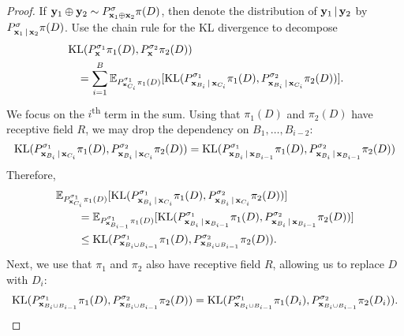 \documentclass[12pt, twoside]{report}
\begin{document}
\begin{proof}
    If $\mathbf{y}_1 \oplus \mathbf{y}_2 \sim P^\sigma_{\mathbf{x}_1 \oplus \mathbf{x}_2} \pi(D)$, then denote the distribution of $\mathbf{y}_1 \,|\, \mathbf{y}_2$ by $P^{\sigma}_{\mathbf{x}_1 \,|\, \mathbf{x}_2} \pi(D)$.
    Use the chain rule for the KL divergence to decompose
    \begin{align}
        &\operatorname{KL}(P^{\sigma_1}_{\mathbf{x}} \pi_1(D), P^{\sigma_2}_{\mathbf{x}} \pi_2(D)) \nonumber \\
        &\quad= \sum_{i=1}^B
        \mathbb{E}_{P_{\mathbf{x}_{C_i}}^{\sigma_1} \pi_1(D)}[
                \operatorname{KL}(
                    P_{\mathbf{x}_{B_i} \,|\, \mathbf{x}_{C_i}}^{\sigma_1} \pi_1(D),
                    P_{\mathbf{x}_{B_i} \,|\, \mathbf{x}_{C_i}}^{\sigma_2} \pi_2(D)
                )
            ].
    \end{align}
    We focus on the $i$\textsuperscript{th} term in the sum.
    Using that $\pi_1(D)$ and $\pi_2(D)$ have receptive field $R$, we may drop the dependency on $B_1, \ldots, B_{i-2}$:
    \begin{align}
        \operatorname{KL}(
            P_{\mathbf{x}_{B_i} \,|\, \mathbf{x}_{C_i}}^{\sigma_1} \pi_1(D),
            P_{\mathbf{x}_{B_i} \,|\, \mathbf{x}_{C_i}}^{\sigma_2} \pi_2(D)
        )
        = \operatorname{KL}(
            P_{\mathbf{x}_{B_i} \,|\, \mathbf{x}_{B_{i-1}}}^{\sigma_1} \pi_1(D),
            P_{\mathbf{x}_{B_i} \,|\, \mathbf{x}_{B_{i-1}}}^{\sigma_2} \pi_2(D)
        )
    \end{align}
    Therefore,
    \begin{align}
        &\mathbb{E}_{P^{\sigma_1}_{\mathbf{x}_{C_i}} \pi_1(D)}[ \operatorname{KL}(
            P_{\mathbf{x}_{B_i} \,|\, \mathbf{x}_{C_i}}^{\sigma_1} \pi_1(D),
            P_{\mathbf{x}_{B_i} \,|\, \mathbf{x}_{C_i}}^{\sigma_2} \pi_2(D)
        )] \nonumber \\
        &\qquad= \mathbb{E}_{P^{\sigma_1}_{\mathbf{x}_{B_{i-1}}}\pi_1(D)}[\operatorname{KL}(
            P_{\mathbf{x}_{B_i} \,|\, \mathbf{x}_{B_{i-1}}}^{\sigma_1} \pi_1(D),
            P_{\mathbf{x}_{B_i} \,|\, \mathbf{x}_{B_{i-1}}}^{\sigma_2} \pi_2(D)
            )] \\
        &\qquad\le \operatorname{KL}(
            P_{\mathbf{x}_{B_i \cup B_{i-1}}}^{\sigma_1} \pi_1(D),
            P_{\mathbf{x}_{B_i \cup B_{i-1}}}^{\sigma_2} \pi_2(D)
            ).
    \end{align}
    Next, we use that $\pi_1$ and $\pi_2$ also have receptive field $R$, allowing us to replace $D$ with $D_i$:
    \begin{align}
        \operatorname{KL}(
            P_{\mathbf{x}_{B_i \cup B_{i-1}}}^{\sigma_1} \pi_1(D),
            P_{\mathbf{x}_{B_i \cup B_{i-1}}}^{\sigma_2} \pi_2(D)
            )
        = \operatorname{KL}(
            P_{\mathbf{x}_{B_i \cup B_{i-1}}}^{\sigma_1} \pi_1(D_i),
            P_{\mathbf{x}_{B_i \cup B_{i-1}}}^{\sigma_2} \pi_2(D_i)
            ).
    \end{align}

\end{proof}
\end{document}
